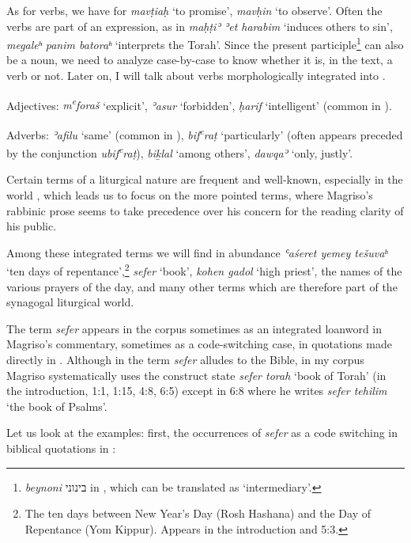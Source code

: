 \documentclass[output=paper,colorlinks,citecolor=brown,babel,arabicfont]{langscibook}
\begin{document}
As for verbs, we have for \textit{mavṭiaḥ} `to promise', \textit{mavḥin} `to observe'. Often the verbs are part of an expression, as in \textit{maḥṭiʾ ʾet harabim} `induces others to sin', \textit{megaleʰ panim batoraʰ} `interprets the Torah'. Since the  present participle\footnote{\textit{beynoni} \texthebrew{בינוני} in , which can be translated as `intermediary'.} can also be a noun, we need to analyze case-by-case to know whether it is, in the text, a verb or not. Later on, I will talk about  verbs morphologically integrated into .

Adjectives: \textit{m\textsuperscript{e}foraš} `explicit', \textit{ʾasur} `forbidden', \textit{ḥarif} `intelligent' (common in ). 

Adverbs: \textit{ʾafilu} `same' (common in ), \textit{bif\textsuperscript{e}raṭ} `particularly' (often appears preceded by the  conjunction \textit{ubif\textsuperscript{e}raṭ}), \textit{bi\b{k}lal} `among others', \textit{dawqaʾ} `only, justly'. 

Certain terms of a liturgical nature are frequent and well-known, especially in the  world \citep[36]{schwarzwald_rodrigue1987}, which leads us to focus on the more pointed terms, where Magriso's rabbinic prose seems to take precedence over his concern for the reading clarity of his public. 

Among these integrated terms we will find in abundance \textit{ʿaśeret yemey tešuvaʰ} `ten days of repentance',\footnote{The ten days between New Year's Day (Rosh Hashana) and the Day of Repentance (Yom Kippur). Appears in the introduction and 5:3.} \textit{sefer} `book', \textit{kohen gadol} `high priest', the names of the various prayers of the day, and many other terms which are therefore part of the synagogal liturgical world.  

The term \textit{sefer} appears in the corpus sometimes as an integrated loanword in Magriso's  commentary, sometimes as a code-switching case, in quotations made directly in . Although in  the term \textit{sefer} alludes to the Bible, in my corpus Magriso systematically uses the construct state \textit{sefer torah} `book of Torah' (in the introduction, 1:1, 1:15, 4:8, 6:5) except in 6:8 where he writes \textit{sefer tehilim} `the book of Psalms'.

Let us look at the examples: first, the occurrences of \textit{sefer} as a code switching in biblical quotations in :
\end{document}
